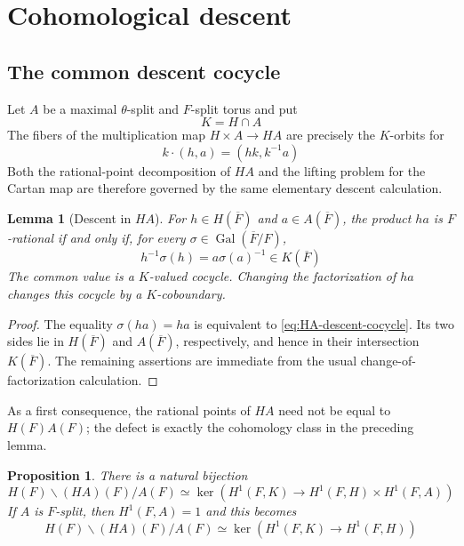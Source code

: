 \documentclass[11pt]{amsart}
\newtheorem{proposition}[proposition]{Proposition}
\newtheorem{lemma}[lemma]{Lemma}
\theoremstyle{definition}
\theoremstyle{remark}
\newcommand{\Fb}{\overline F}
\begin{document}
\section{Cohomological descent}

\subsection{The common descent cocycle}
Let $A$ be a maximal $\theta$-split and $F$-split torus and put
\[
 K=H\cap A
\]
The fibers of the multiplication map $H\times A\to HA$ are precisely the
$K$-orbits for
\[
 k\cdot(h,a)=(hk,k^{-1}a)
\]
Both the rational-point decomposition of $HA$ and the lifting problem for the
Cartan map are therefore governed by the same elementary descent calculation.

\begin{lemma}[Descent in $HA$]\label{lem:HA-descent}
For $h\in H(\Fb)$ and $a\in A(\Fb)$, the product $ha$ is $F$-rational if and
only if, for every $\sigma\in\operatorname{Gal}(\Fb/F)$,
\begin{equation}\label{eq:HA-descent-cocycle}
 h^{-1}\sigma(h)=a\sigma(a)^{-1}\in K(\Fb)
\end{equation}
The common value is a $K$-valued cocycle.  Changing the factorization of
$ha$ changes this cocycle by a $K$-coboundary.
\end{lemma}

\begin{proof}
The equality $\sigma(ha)=ha$ is equivalent to
\eqref{eq:HA-descent-cocycle}.  Its two sides lie in $H(\Fb)$ and $A(\Fb)$,
respectively, and hence in their intersection $K(\Fb)$.  The remaining
assertions are immediate from the usual change-of-factorization calculation.
\end{proof}

As a first consequence, the rational points of $HA$ need not be equal to
$H(F)A(F)$; the defect is exactly the cohomology class in the preceding
lemma.

\begin{proposition}\label{prop:double-cosets}
There is a natural bijection
\begin{equation}\label{eq:double-cosets}
 H(F)\backslash (HA)(F)/A(F)
 \simeq
 \ker\left(
 H^1(F,K)\longrightarrow H^1(F,H)\times H^1(F,A)
 \right)
\end{equation}
If $A$ is $F$-split, then $H^1(F,A)=1$ and this becomes
\begin{equation}\label{eq:double-cosets-split}
 H(F)\backslash (HA)(F)/A(F)
 \simeq
 \ker\left(H^1(F,K)\longrightarrow H^1(F,H)\right)
\end{equation}
\end{proposition}
\end{document}
